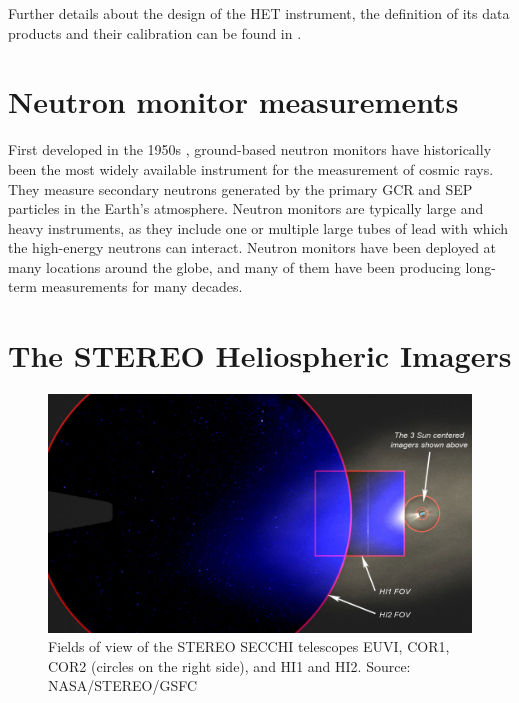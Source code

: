 Further details about the design of the \ac{HET} instrument, the definition of its data products and their calibration can be found in \citet{Elftmann-2020-PhD}. 

\section{Neutron monitor measurements}
\label{sec:neutronmonitors}

First developed in the 1950s \citep[see e.g.]{Simpson-2000}, ground-based neutron monitors have historically been the most widely available instrument for the measurement of cosmic rays. They measure secondary neutrons generated by the primary \ac{GCR} and \ac{SEP} particles in the Earth's atmosphere. Neutron monitors are typically large and heavy instruments, as they include one or multiple large tubes of lead with which the high-energy neutrons can interact. Neutron monitors have been deployed at many locations around the globe, and many of them have been producing long-term measurements for many decades.


\section{The STEREO Heliospheric Imagers}
\label{sec:stereohi}

\begin{figure}
    \centering
    \includegraphics[width=0.8\linewidth]{images/secchi_fov}
    \caption[Fields of view of the \acs{STEREO} SECCHI telescopes]{Fields of view of the \ac{STEREO} SECCHI telescopes EUVI, COR1, COR2 (circles on the right side), and HI1 and HI2. Source: NASA/STEREO/GSFC}
    \label{fig:secchifov}
\end{figure}

